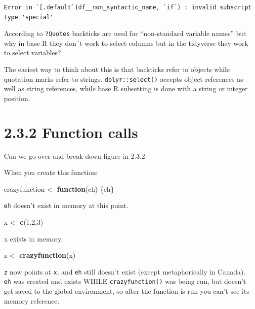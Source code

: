 \documentclass[]{book}
\newenvironment{Shaded}{\begin{snugshade}}{\end{snugshade}}
\newcommand{\ControlFlowTok}[1]{\textcolor[rgb]{0.13,0.29,0.53}{\textbf{#1}}}
\newcommand{\DecValTok}[1]{\textcolor[rgb]{0.00,0.00,0.81}{#1}}
\newcommand{\KeywordTok}[1]{\textcolor[rgb]{0.13,0.29,0.53}{\textbf{#1}}}
\newcommand{\NormalTok}[1]{#1}
\newcommand{\StringTok}[1]{\textcolor[rgb]{0.31,0.60,0.02}{#1}}
\begin{document}
\begin{verbatim}
Error in `[.default`(df__non_syntactic_name, `if`) : invalid subscript type 'special'
\end{verbatim}

According to \texttt{?Quotes} backticks are used for ``non-standard variable names'' but why in base R they don´t work to select columns but in the tidyverse they work to select variables?

The easiest way to think about this is that backticks refer to objects while quotation marks refer to strings. \texttt{dplyr::select()} accepts object references as well as string references, while base R subsetting is done with a string or integer position.

\hypertarget{function-calls}{%
\section*{2.3.2 Function calls}\label{function-calls}}

Can we go over and break down figure in 2.3.2

When you create this function:

\begin{Shaded}
\begin{Highlighting}[]
\NormalTok{crazyfunction <-}\StringTok{ }\ControlFlowTok{function}\NormalTok{(eh) \{eh\}}
\end{Highlighting}
\end{Shaded}

\texttt{eh} doesn't exist in memory at this point.

\begin{Shaded}
\begin{Highlighting}[]
\NormalTok{x <-}\StringTok{ }\KeywordTok{c}\NormalTok{(}\DecValTok{1}\NormalTok{,}\DecValTok{2}\NormalTok{,}\DecValTok{3}\NormalTok{)}
\end{Highlighting}
\end{Shaded}

x exists in memory.

\begin{Shaded}
\begin{Highlighting}[]
\NormalTok{z <-}\StringTok{ }\KeywordTok{crazyfunction}\NormalTok{(x) }
\end{Highlighting}
\end{Shaded}

\texttt{z} now points at \texttt{x}, and \texttt{eh} still doesn't exist (except metaphorically in Canada). \texttt{eh} was created and exists WHILE \texttt{crazyfunction()} was being run, but doesn't get saved to the global environment, so after the function is run you can't see its memory reference.
\end{document}

